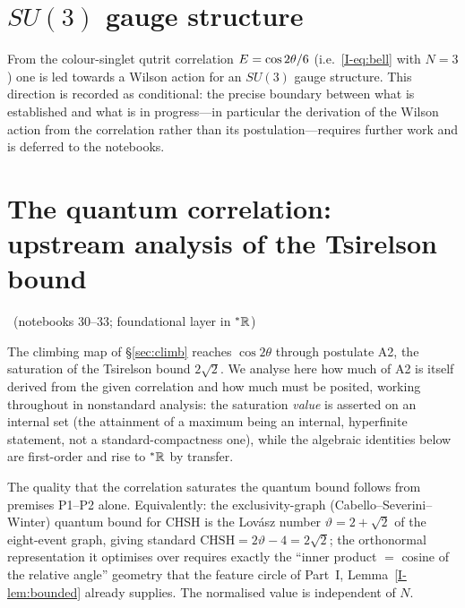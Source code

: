 \documentclass[11pt]{article}
\begin{document}
\section{$SU(3)$ gauge structure}\label{sec:su3}
\conditional

From the colour-singlet qutrit correlation $E=\cos2\theta/6$ (i.e.~\eqref{I-eq:bell}
with $N=3$) one is led towards a Wilson action for an $SU(3)$ gauge structure. This
direction is recorded as conditional: the precise boundary between what is established and
what is in progress---in particular the derivation of the Wilson action from the
correlation rather than its postulation---requires further work and is deferred to the
notebooks. 

\section{The quantum correlation: upstream analysis of the Tsirelson bound}\label{sec:qcorr}
\established\ (notebooks 30--33; foundational layer in \texorpdfstring{${}^{*}\mathbb{R}$}{*R})

The climbing map of \S\ref{sec:climb} reaches $\cos2\theta$ through postulate A2, the
saturation of the Tsirelson bound $2\sqrt2$. We analyse here how much of A2 is itself derived
from the given correlation and how much must be posited, working throughout in nonstandard
analysis: the saturation \emph{value} is asserted on an internal set (the attainment of a
maximum being an internal, hyperfinite statement, not a standard-compactness one), while the
algebraic identities below are first-order and rise to ${}^{*}\mathbb{R}$ by transfer.

\begin{proposition}\label{prop:qual}
The quality that the correlation saturates the quantum bound follows from premises P1--P2
alone. Equivalently: the exclusivity-graph (Cabello--Severini--Winter) quantum bound for CHSH
is the Lov\'asz number $\vartheta=2+\sqrt2$ of the eight-event graph, giving standard
$\text{CHSH}=2\vartheta-4=2\sqrt2$; the orthonormal representation it optimises over requires
exactly the ``inner product $=$ cosine of the relative angle'' geometry that the feature
circle of Part~I, Lemma~\ref{I-lem:bounded} already supplies. The normalised value is
independent of $N$.
\end{proposition}
\end{document}
